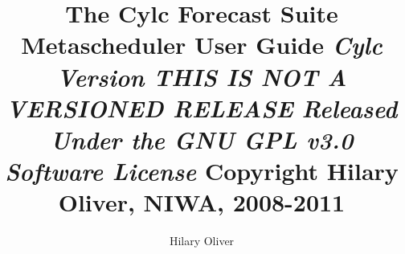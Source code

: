 \documentclass[11pt,a4paper,titlepage]{article}
\title{The Cylc Forecast Suite Metascheduler\linebreak 
User Guide \linebreak 
{\em \small Cylc Version THIS IS NOT A VERSIONED RELEASE} \linebreak
{\em \small Released Under the GNU GPL v3.0 Software License} \linebreak
{\small Copyright Hilary Oliver, NIWA, 2008-2011}}
\author{Hilary Oliver}
\begin{document}
\maketitle

\pagebreak



\pagebreak
\tableofcontents
\listoffigures

\pagebreak

\end{document}
